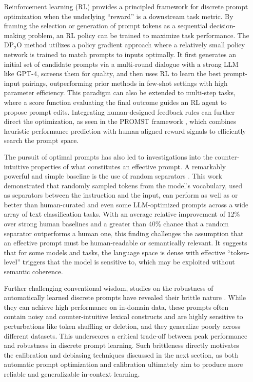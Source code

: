 \documentclass[11pt]{article}
\begin{document}
Reinforcement learning (RL) provides a principled framework for discrete prompt optimization when the underlying ``reward'' is a downstream task metric. By framing the selection or generation of prompt tokens as a sequential decision-making problem, an RL policy can be trained to maximize task performance. The DP\(_2\)O method \cite{ref171} utilizes a policy gradient approach where a relatively small policy network is trained to match prompts to inputs optimally. It first generates an initial set of candidate prompts via a multi-round dialogue with a strong LLM like GPT-4, screens them for quality, and then uses RL to learn the best prompt-input pairings, outperforming prior methods in few-shot settings with high parameter efficiency. This paradigm can also be extended to multi-step tasks, where a score function evaluating the final outcome guides an RL agent to propose prompt edits. Integrating human-designed feedback rules can further direct the optimization, as seen in the PROMST framework \cite{ref172}, which combines heuristic performance prediction with human-aligned reward signals to efficiently search the prompt space.

The pursuit of optimal prompts has also led to investigations into the counter-intuitive properties of what constitutes an effective prompt. A remarkably powerful and simple baseline is the use of random separators \cite{ref173}. This work demonstrated that randomly sampled tokens from the model's vocabulary, used as separators between the instruction and the input, can perform as well as or better than human-curated and even some LLM-optimized prompts across a wide array of text classification tasks. With an average relative improvement of 12\% over strong human baselines and a greater than 40\% chance that a random separator outperforms a human one, this finding challenges the assumption that an effective prompt must be human-readable or semantically relevant. It suggests that for some models and tasks, the language space is dense with effective ``token-level'' triggers that the model is sensitive to, which may be exploited without semantic coherence.

Further challenging conventional wisdom, studies on the robustness of automatically learned discrete prompts have revealed their brittle nature \cite{ref174}. While they can achieve high performance on in-domain data, these prompts often contain noisy and counter-intuitive lexical constructs and are highly sensitive to perturbations like token shuffling or deletion, and they generalize poorly across different datasets. This underscores a critical trade-off between peak performance and robustness in discrete prompt learning. Such brittleness directly motivates the calibration and debiasing techniques discussed in the next section, as both automatic prompt optimization and calibration ultimately aim to produce more reliable and generalizable in-context learning.
\end{document}
